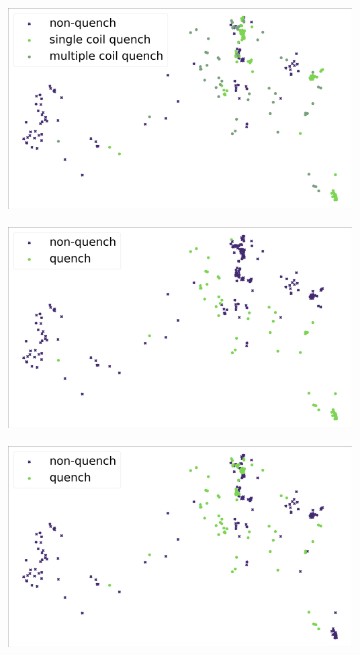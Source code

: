 \begin{figure}[!ht]
	\centering
	\begin{subfigure}{\linewidth}
		\includegraphics[width=\linewidth]{img/quench_dist_qlp/single_vs_multiple_Phi.png}
		\subcaption{}
	\end{subfigure}
	\begin{subfigure}{0.49\linewidth}
		\includegraphics[width=\linewidth]{img/quench_dist_qlp/quenches_coil_0_Phi.png}
		\subcaption{}
	\end{subfigure}
	\begin{subfigure}{0.49\linewidth}
		\includegraphics[width=\linewidth]{img/quench_dist_qlp/quenches_coil_1_Phi.png}

\end{subfigure}
\end{figure}
